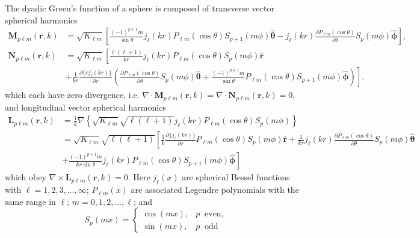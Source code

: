 \documentclass{article}
\begin{document}
The dyadic Green's function of a sphere is composed of transverse vector spherical harmonics
\begin{equation}
\begin{split}
\mathbf{M}_{p\ell m}(\mathbf{r},k) &= \sqrt{K_{\ell m}}\left[\frac{(-1)^{p + 1}m}{\sin\theta}j_\ell(kr)P_{\ell m}(\cos\theta)S_{p+1}(m\phi)\hat{\bm{\theta}} - j_\ell(kr)\frac{\partial P_{\ell m}(\cos\theta)}{\partial\theta}S_p(m\phi)\hat{\bm{\phi}}\right],\\[0.5em]
\mathbf{N}_{p\ell m}(\mathbf{r},k) &= \sqrt{K_{\ell m}}\left[\frac{\ell(\ell + 1)}{kr}j_\ell(kr)P_{\ell m}(\cos\theta)S_p(m\phi)\hat{\mathbf{r}}\right.\\
&+ \left.\frac{1}{kr}\frac{\partial\{rj_\ell(kr)\}}{\partial r}\left(\frac{\partial P_{\ell m}(\cos\theta)}{\partial\theta}S_p(m\phi)\hat{\bm{\theta}} + \frac{(-1)^{p+1}m}{\sin\theta}P_{\ell m}(\cos\theta)S_{p + 1}(m\phi)\hat{\bm{\phi}}\right)\right],
\end{split}
\end{equation}
which each have zero divergence, i.e. $\nabla\cdot\mathbf{M}_{p\ell m}(\mathbf{r},k) = \nabla\cdot\mathbf{N}_{p\ell m}(\mathbf{r},k) = 0$, and longitudinal vector spherical harmonics
\begin{equation}
\begin{split}
\mathbf{L}_{p\ell m}(\mathbf{r},k) &= \frac{1}{k}\nabla\left\{\sqrt{K_{\ell m}}\sqrt{\ell(\ell + 1)}j_\ell(kr)P_{\ell m}(\cos\theta)S_p(m\phi)\right\}\\
&= \sqrt{K_{\ell m}}\sqrt{\ell(\ell + 1)}\left[\frac{1}{k}\frac{\partial\{j_\ell(kr)\}}{\partial r}P_{\ell m}(\cos\theta)S_p(m\phi)\hat{\mathbf{r}} + \frac{1}{kr}j_\ell(kr)\frac{\partial P_{\ell m}(\cos\theta)}{\partial\theta}S_p(m\phi)\hat{\bm{\theta}}\right.\\
&\left. + \frac{(-1)^{p+1}m}{kr\sin\theta}j_\ell(kr)P_{\ell m}(\cos\theta)S_{p+1}(m\phi)\hat{\bm{\phi}}\right]
\end{split}
\end{equation}
which obey $\nabla\times\mathbf{L}_{p\ell m}(\mathbf{r},k) = 0$. Here $j_\ell(x)$ are spherical Bessel functions with $\ell = 1,2,3,\ldots,\infty$; $P_{\ell m}(x)$ are associated Legendre polynomials with the same range in $\ell$; $m = 0,1,2,\ldots,\ell$; and 
\begin{equation}
S_p(mx) = 
\begin{cases}
\cos(mx), & p\;\;\mathrm{even},\\
\sin(mx), & p \;\;\mathrm{odd}
\end{cases}
\end{equation}
\end{document}
